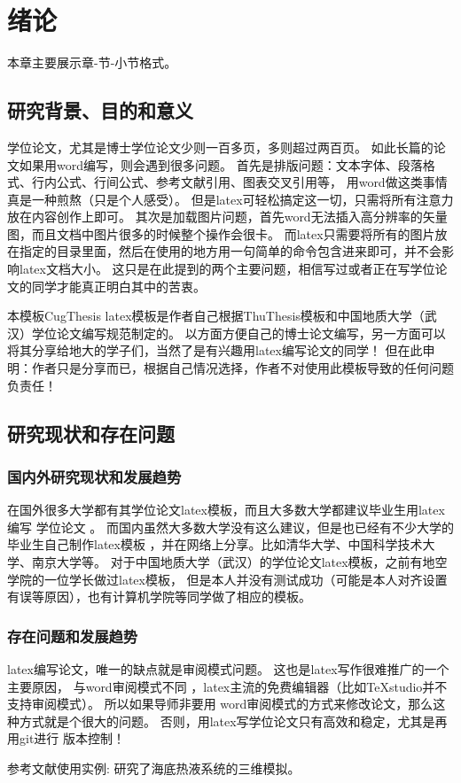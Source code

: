 
\chapter{绪论}
\label{chapter:Introduction}

本章主要展示章-节-小节格式。

\section{研究背景、目的和意义}
学位论文，尤其是博士学位论文少则一百多页，多则超过两百页。
如此长篇的论文如果用word编写，则会遇到很多问题。
首先是排版问题：文本字体、段落格式、行内公式、行间公式、参考文献引用、图表交叉引用等，
用word做这类事情真是一种煎熬（只是个人感受）。
但是latex可轻松搞定这一切，只需将所有注意力放在内容创作上即可。
其次是加载图片问题，首先word无法插入高分辨率的矢量图，而且文档中图片很多的时候整个操作会很卡。
而latex只需要将所有的图片放在指定的目录里面，然后在使用的地方用一句简单的命令包含进来即可，并不会影响latex文档大小。
这只是在此提到的两个主要问题，相信写过或者正在写学位论文的同学才能真正明白其中的苦衷。

本模板CugThesis latex模板是作者自己根据ThuThesis模板和中国地质大学（武汉）学位论文编写规范制定的。
以方面方便自己的博士论文编写，另一方面可以将其分享给地大的学子们，当然了是有兴趣用latex编写论文的同学！
但在此申明：作者只是分享而已，根据自己情况选择，作者不对使用此模板导致的任何问题负责任！


\section{研究现状和存在问题}


\subsection{国内外研究现状和发展趋势}
在国外很多大学都有其学位论文latex模板，而且大多数大学都建议毕业生用latex编写 学位论文 \citep{andersen2017faulting}。
而国内虽然大多数大学没有这么建议，但是也已经有不少大学的毕业生自己制作latex模板 ，并在网络上分享。比如清华大学、中国科学技术大学、南京大学等。
对于中国地质大学（武汉）的学位论文latex模板，之前有地空学院的一位学长做过latex模板，
但是本人并没有测试成功（可能是本人对齐设置有误等原因），也有计算机学院等同学做了相应的模板。


\subsection{存在问题和发展趋势}
latex编写论文，唯一的缺点就是审阅模式问题。
这也是latex写作很难推广的一个主要原因，
与word审阅模式不同 ，latex主流的免费编辑器（比如TeXstudio并不支持审阅模式）。
所以如果导师非要用 word审阅模式的方式来修改论文，那么这种方式就是个很大的问题。
否则，用latex写学位论文只有高效和稳定，尤其是再用git进行 版本控制！

参考文献使用实例: \cite{coumou2006dynamics}研究了海底热液系统的三维模拟。



